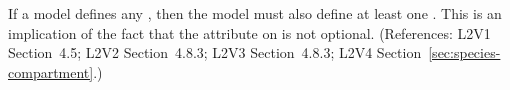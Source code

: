If a model defines any \Species, then the model must also define at least
one \Compartment.  This is an implication of the fact that the
 attribute on \Species is not optional.  (References: L2V1
Section~4.5; L2V2 Section~4.8.3; L2V3 Section~4.8.3; L2V4 Section~\ref{sec:species-compartment}.)
